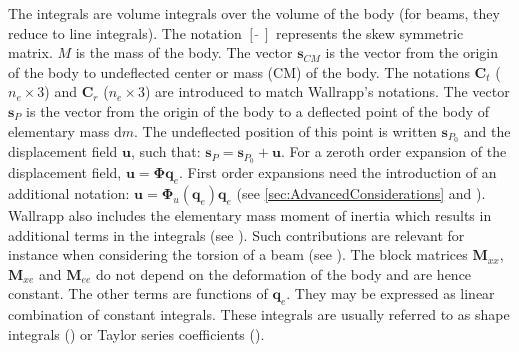 \documentclass[wes, manuscript]{copernicus}
\renewcommand{\d}{\mathrm{d}}
\renewcommand{\v}[1]{\boldsymbol{#1}}
\newcommand{\m}[1]{\boldsymbol{#1}}
\newcommand{\M} {{\m{M}}}
\newcommand{\s}{\v{s}}
\renewcommand{\d}{\mathrm{d}}
\newcommand{\dm}{\d{m}}
\begin{document}
The integrals are volume integrals over the volume of the body (for beams, they reduce to line integrals).
    The notation $[\tilde{\ \ }]$ represents the skew symmetric matrix.
    $M$ is the mass of the body. 
The vector $\v{s}_{CM}$ is the vector from the origin of the body to undeflected center or mass (CM) of the body.
The notations $\m{C}_t$ ($n_e\times 3$) and $\m{C}_r$ ($n_e\times 3$) are introduced to match Wallrapp's notations.
The vector $\s_{P}$ is the vector from the origin of the body to a deflected point of the body of elementary mass $\dm$.
The undeflected position of this point is written $\s_{P_0}$ and the displacement field $\v{u}$, such that:  $\s_{P}=\s_{P_0} + \v{u}$.
For a zeroth order expansion of the displacement field, $\v{u}=\m{\Phi} \v{q}_e$.
First order expansions need the introduction of an additional notation:  $\v{u}=\m{\Phi}_u(\v{q}_e) \v{q}_e$ (see \autoref{sec:AdvancedConsiderations} and \cite{Wallrapp:1994}).
Wallrapp also includes the elementary mass moment of inertia which results in additional terms in the integrals (see \cite{Wallrapp:1994}).
Such contributions are relevant for instance when considering the torsion of a beam (see \cite{branlard:2019flex}).
The block matrices $\M_{xx}$, $\M_{xe}$ and $\M_{ee}$ do not depend on the deformation of the body and are hence constant.
The other terms are functions of $\v{q}_e$.
They may be expressed as linear combination of constant integrals.
These integrals are usually referred to as shape integrals (\cite{shabana:book}) or Taylor series coefficients (\cite{Wallrapp:1994}). 
\end{document}
